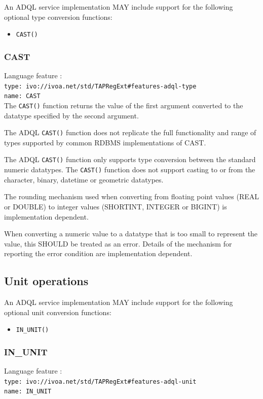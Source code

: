 \documentclass[11pt,a4paper]{ivoa}
\begin{document}
An ADQL service implementation MAY include support for the following optional
type conversion functions:

\begin{itemize}
    \item \verb:CAST():
\end{itemize}

\subsubsection{CAST}
\label{sec:type.cast}
{\footnotesize Language feature :}\\
{\footnotesize \verb|type: ivo://ivoa.net/std/TAPRegExt#features-adql-type|}\\
{\footnotesize \verb|name: CAST|}\\

The \verb:CAST(): function returns the value of the first argument converted
to the datatype specified by the second argument.

The ADQL \verb:CAST(): function does not replicate the full functionality
and range of types supported by common RDBMS implementations of CAST.

The ADQL \verb:CAST(): function only supports type conversion between the
standard numeric datatypes. The \verb:CAST(): function does not support
casting to or from the character, binary, datetime or geometric datatypes.

The rounding mechanism used when converting from floating point values
(REAL or DOUBLE) to integer values (SHORTINT, INTEGER or BIGINT) is
implementation dependent.

When converting a numeric value to a datatype that is too small to represent
the value, this SHOULD be treated as an error.
Details of the mechanism for reporting the error condition are
implementation dependent.

\subsection{Unit operations}
\label{sec:unit}

An ADQL service implementation MAY include support for the following optional
unit conversion functions:

\begin{itemize}
    \item \verb:IN_UNIT():
\end{itemize}

\subsubsection{IN\_UNIT}
\label{sec:unit.cast}
{\footnotesize Language feature :}\\
{\footnotesize \verb|type: ivo://ivoa.net/std/TAPRegExt#features-adql-unit|}\\
{\footnotesize \verb|name: IN_UNIT|}\\
\end{document}
